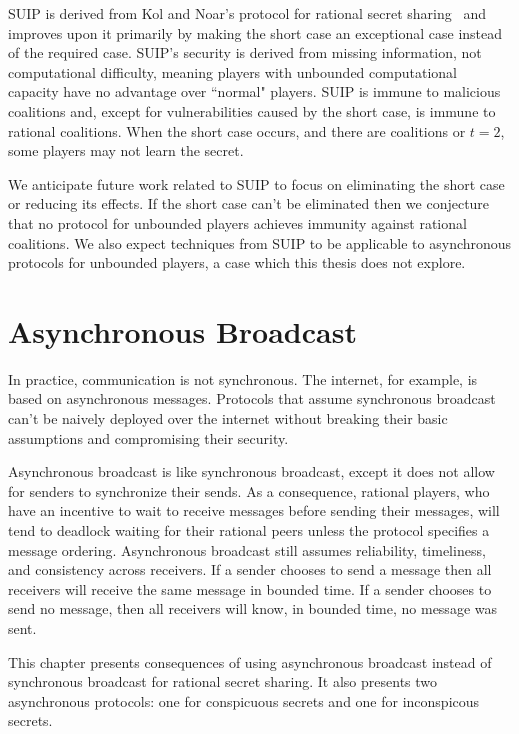 \documentclass{dalcsthesis}
\begin{document}
SUIP is derived from Kol and Noar's protocol for rational secret sharing~\cite{kol08} and improves upon it primarily by making the short case an exceptional case instead of the required case. SUIP's security is derived from missing information, not computational difficulty, meaning players with unbounded computational capacity have no advantage over ``normal" players. SUIP is immune to malicious coalitions and, except for vulnerabilities caused by the short case, is immune to rational coalitions. When the short case occurs, and there are coalitions or $t=2$, some players may not learn the secret.

We anticipate future work related to SUIP to focus on eliminating the short case or reducing its effects. If the short case can't be eliminated then we conjecture that no protocol for unbounded players achieves immunity against rational coalitions. We also expect techniques from SUIP to be applicable to asynchronous protocols for unbounded players, a case which this thesis does not explore.





\chapter{Asynchronous Broadcast}
\label{chapter:Asynchronous}

In practice, communication is not synchronous. The internet, for example, is based on asynchronous messages. Protocols that assume synchronous broadcast can't be naively deployed over the internet without breaking their basic assumptions and compromising their security.

Asynchronous broadcast is like synchronous broadcast, except it does not allow for senders to synchronize their sends. As a consequence, rational players, who have an incentive to wait to receive messages before sending their messages, will tend to deadlock waiting for their rational peers unless the protocol specifies a message ordering. Asynchronous broadcast still assumes reliability, timeliness, and consistency across receivers. If a sender chooses to send a message then all receivers will receive the same message in bounded time. If a sender chooses to send no message, then all receivers will know, in bounded time, no message was sent.

This chapter presents consequences of using asynchronous broadcast instead of synchronous broadcast for rational secret sharing. It also presents two asynchronous protocols: one for conspicuous secrets and one for inconspicous secrets.
\end{document}
